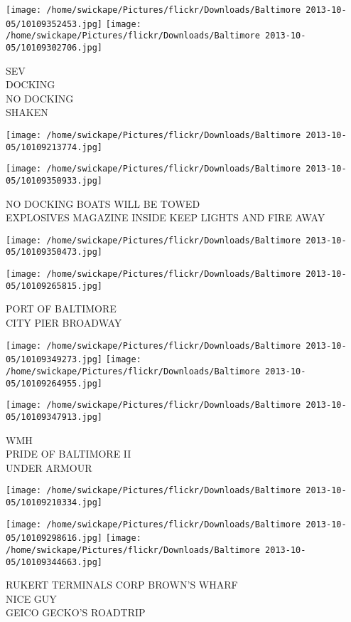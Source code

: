 \documentclass[10pt,letterpaper]{article}
\begin{document}
\texttt{[image: /home/swickape/Pictures/flickr/Downloads/Baltimore 2013-10-05/10109352453.jpg]}
\texttt{[image: /home/swickape/Pictures/flickr/Downloads/Baltimore 2013-10-05/10109302706.jpg]}

SEV\\
DOCKING\\
NO DOCKING\\
SHAKEN
\pagebreak

\texttt{[image: /home/swickape/Pictures/flickr/Downloads/Baltimore 2013-10-05/10109213774.jpg]}

\vspace{0.25in}
\texttt{[image: /home/swickape/Pictures/flickr/Downloads/Baltimore 2013-10-05/10109350933.jpg]}

NO DOCKING BOATS WILL BE TOWED\\
EXPLOSIVES MAGAZINE INSIDE KEEP LIGHTS AND FIRE AWAY
\pagebreak

\texttt{[image: /home/swickape/Pictures/flickr/Downloads/Baltimore 2013-10-05/10109350473.jpg]}

\vspace{0.25in}
\texttt{[image: /home/swickape/Pictures/flickr/Downloads/Baltimore 2013-10-05/10109265815.jpg]}

PORT OF BALTIMORE\\
CITY PIER BROADWAY
\pagebreak

\texttt{[image: /home/swickape/Pictures/flickr/Downloads/Baltimore 2013-10-05/10109349273.jpg]}
\texttt{[image: /home/swickape/Pictures/flickr/Downloads/Baltimore 2013-10-05/10109264955.jpg]}

\texttt{[image: /home/swickape/Pictures/flickr/Downloads/Baltimore 2013-10-05/10109347913.jpg]}

WMH\\
PRIDE OF BALTIMORE II\\
UNDER ARMOUR
\pagebreak

\texttt{[image: /home/swickape/Pictures/flickr/Downloads/Baltimore 2013-10-05/10109210334.jpg]}

\vspace{0.25in}
\texttt{[image: /home/swickape/Pictures/flickr/Downloads/Baltimore 2013-10-05/10109298616.jpg]}
\texttt{[image: /home/swickape/Pictures/flickr/Downloads/Baltimore 2013-10-05/10109344663.jpg]}

RUKERT TERMINALS CORP BROWN'S WHARF\\
NICE GUY\\
GEICO GECKO'S ROADTRIP
\pagebreak
\end{document}
